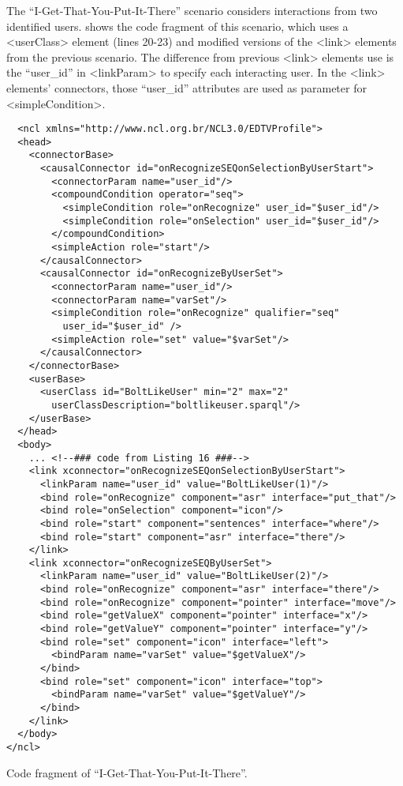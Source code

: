 The “I-Get-That-You-Put-It-There” scenario considers interactions from two
identified users. \label{list:annexb6} shows the code fragment of this scenario,
which uses a <userClass> element (lines 20-23) and modified versions of the
<link> elements from the previous scenario. The difference from previous <link>
elements use is the “user\_id” in <linkParam> to specify each interacting user.
In the <link> elements’ connectors, those “user\_id” attributes are used as
parameter for <simpleCondition>.

\begin{verbatim}
  <ncl xmlns="http://www.ncl.org.br/NCL3.0/EDTVProfile">
  <head>
    <connectorBase>
      <causalConnector id="onRecognizeSEQonSelectionByUserStart">
        <connectorParam name="user_id"/>
        <compoundCondition operator="seq">
          <simpleCondition role="onRecognize" user_id="$user_id"/>
          <simpleCondition role="onSelection" user_id="$user_id"/>
        </compoundCondition>
        <simpleAction role="start"/>
      </causalConnector>
      <causalConnector id="onRecognizeByUserSet">
        <connectorParam name="user_id"/>
        <connectorParam name="varSet"/>
        <simpleCondition role="onRecognize" qualifier="seq"
          user_id="$user_id" />
        <simpleAction role="set" value="$varSet"/>
      </causalConnector>
    </connectorBase>
    <userBase>
      <userClass id="BoltLikeUser" min="2" max="2"
        userClassDescription="boltlikeuser.sparql"/>
    </userBase>
  </head>
  <body>
    ... <!--### code from Listing 16 ###-->
    <link xconnector="onRecognizeSEQonSelectionByUserStart">
      <linkParam name="user_id" value="BoltLikeUser(1)"/>
      <bind role="onRecognize" component="asr" interface="put_that"/>
      <bind role="onSelection" component="icon"/>
      <bind role="start" component="sentences" interface="where"/>
      <bind role="start" component="asr" interface="there"/>
    </link>
    <link xconnector="onRecognizeSEQByUserSet">
      <linkParam name="user_id" value="BoltLikeUser(2)"/>
      <bind role="onRecognize" component="asr" interface="there"/>
      <bind role="onRecognize" component="pointer" interface="move"/>
      <bind role="getValueX" component="pointer" interface="x"/>
      <bind role="getValueY" component="pointer" interface="y"/>
      <bind role="set" component="icon" interface="left">
        <bindParam name="varSet" value="$getValueX"/>
      </bind>
      <bind role="set" component="icon" interface="top">
        <bindParam name="varSet" value="$getValueY"/>
      </bind>
    </link>
  </body>
</ncl>
\end{verbatim}
\begin{listing}[!ht]
\caption{Code fragment of “I-Get-That-You-Put-It-There”.}
\label{list:annexb6}
\end{listing}


